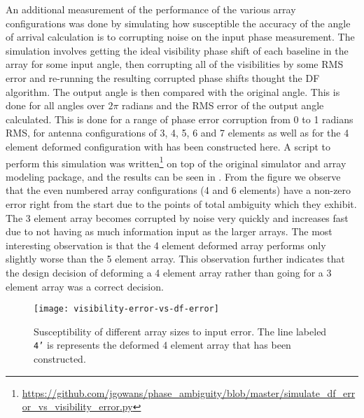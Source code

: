 An additional measurement of the performance of the various array configurations was done by simulating how susceptible the accuracy of the angle of arrival calculation is to corrupting noise on the input phase measurement. The simulation involves getting the ideal visibility phase shift of each baseline in the array for some input angle, then corrupting all of the visibilities by some RMS error and re-running the resulting corrupted phase shifts thought the DF algorithm. The output angle is then compared with the original angle. This is done for all angles over \(2\pi\) radians and the RMS error of the output angle calculated. This is done for a range of phase error corruption from 0 to 1 radians RMS, for antenna configurations of 3, 4, 5, 6 and 7 elements as well as for the 4 element deformed configuration with has been constructed here. A script to perform this simulation was written\footnote{\url{https://github.com/jgowans/phase_ambiguity/blob/master/simulate_df_error_vs_visibility_error.py}} on top of the original simulator and array modeling package, and the results can be seen in . From the figure we observe that the even numbered array configurations (4 and 6 elements) have a non-zero error right from the start due to the points of total ambiguity which they exhibit. The 3 element array becomes corrupted by noise very quickly and increases fast due to not having as much information input as the larger arrays. The most interesting observation is that the 4 element deformed array performs only slightly worse than the 5 element array. This observation further indicates that the design decision of deforming a 4 element array rather than going for a 3 element array was a correct decision.

\begin{figure}
  \centering
  \texttt{[image: visibility-error-vs-df-error]}
  \caption{Susceptibility of different array sizes to input error. The line labeled \texttt{4'} is represents the deformed 4 element array that has been constructed.}
  \label{fig:antenna-array:configuration-vs-input-error-vs-output-error}
\end{figure}
